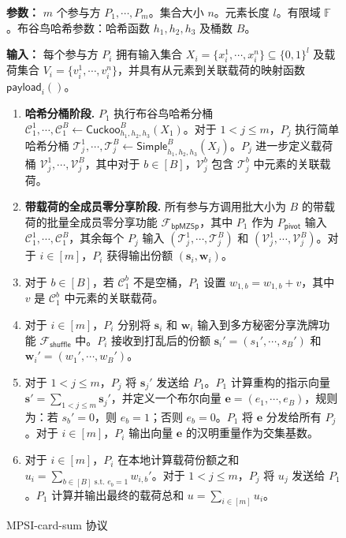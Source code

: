 \begin{figure}[!htb]
\begin{framed}
\begin{minipage}[c]{\textwidth}
\begin{trivlist}
\item \textbf{参数：} $m$ 个参与方 $P_1, \cdots, P_m$。集合大小 $n$。元素长度 $l$。有限域 $\mathbb{F}$。布谷鸟哈希参数：哈希函数 $h_1, h_2, h_3$ 及桶数 $B$。
\item \textbf{输入：} 每个参与方 $P_i$ 拥有输入集合 $X_i = \{x_i^1,\cdots, x_i^n\} \subseteq \{0,1\}^l$ 及载荷集合 $V_i = \{v_i^1,\cdots, v_i^n\}$，并具有从元素到关联载荷的映射函数 $\mathsf{payload}_i()$。

\begin{enumerate}[itemsep=2pt,topsep=0pt,parsep=0pt,leftmargin=15pt]
    \item \textbf{哈希分桶阶段.} $P_1$ 执行布谷鸟哈希分桶 $\mathcal{C}_1^1, \cdots, \mathcal{C}_1^B \gets \mathsf{Cuckoo}_{h_1,h_2,h_3}^B(X_1)$。对于 $1 < j \le m$，$P_j$ 执行简单哈希分桶 $\mathcal{T}_j^1, \cdots, \mathcal{T}_j^B \gets \mathsf{Simple}_{h_1,h_2,h_3}^B(X_j)$。$P_j$ 进一步定义载荷桶 $\mathcal{V}_j^1, \cdots, \mathcal{V}_j^B$，其中对于 $b \in [B]$，$\mathcal{V}_j^b$ 包含 $\mathcal{T}_j^b$ 中元素的关联载荷。
    \item \textbf{带载荷的全成员零分享阶段.} 所有参与方调用批大小为 $B$ 的带载荷的批量全成员零分享功能 $\mathcal{F}_{\mathsf{bpMZSp}}$，其中 $P_1$ 作为 $P_\mathsf{pivot}$ 输入 $\mathcal{C}_1^1, \cdots, \mathcal{C}_1^B$，其余每个 $P_j$ 输入 $(\mathcal{T}_j^1, \cdots, \mathcal{T}_j^B)$ 和 $(\mathcal{V}_j^1, \cdots, \mathcal{V}_j^B)$。对于 $i \in [m]$，$P_i$ 获得输出份额 $(\textbf{s}_i, \textbf{w}_i)$。
    \item 对于 $b \in [B]$，若 $\mathcal{C}_1^b$ 不是空桶，$P_1$ 设置 $w_{1,b} = w_{1,b} + v$，其中 $v$ 是 $\mathcal{C}_1^b$ 中元素的关联载荷。
    \item 对于 $i \in [m]$，$P_i$ 分别将 $\textbf{s}_i$ 和 $\textbf{w}_i$ 输入到多方秘密分享洗牌功能 $\mathcal{F}_{\mathsf{shuffle}}$ 中。$P_i$ 接收到打乱后的份额 $\textbf{s}_{i}' = (s_1', \cdots, s_B')$ 和 $\textbf{w}_{i}' = (w_1', \cdots, w_B')$。
    \item 对于 $1 < j  \le m$，$P_j$ 将 $\textbf{s}_j'$ 发送给 $P_1$。$P_1$ 计算重构的指示向量 $\textbf{s}' = \sum_{1 < j  \le m} \textbf{s}_j'$，并定义一个布尔向量 $\textbf{e} = (e_1, \cdots, e_B)$，规则为：若 $s_b' = 0$，则 $e_b = 1$；否则 $e_b = 0$。$P_1$ 将 $\textbf{e}$ 分发给所有 $P_j$。对于 $i \in [m]$，$P_i$ 输出向量 $\textbf{e}$ 的汉明重量作为交集基数。
    \item 对于 $i \in [m]$，$P_i$ 在本地计算载荷份额之和 $u_i = \sum_{b \in [B] \text{ s.t. } e_b = 1} w_{i,b}'$。对于 $1 < j  \le m$，$P_j$ 将 $u_j$ 发送给 $P_1$。$P_1$ 计算并输出最终的载荷总和 $u = \sum_{i \in [m]} u_i$。
\end{enumerate}
\end{trivlist}
\end{minipage}
\end{framed}
\caption{MPSI-card-sum 协议}\label{fig:proto-mpsi-sum}
\end{figure}

